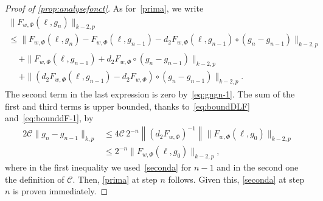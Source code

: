 \documentclass[10pt]{amsart}
\theoremstyle{definition}\newtheorem{defi}[theo]{Definition}\newtheorem{rema}[theo]{Remark}\newtheorem{exam}[theo]{Example}\newtheorem{exem}[theo]{Example}\newtheorem{nota}[theo]{Notation}
\newcommand{\clC}{\mathcal{C}}
\begin{document}
\begin{proof}[Proof of \cref{prop:analysefonct}]
As for~\eqref{prima}, we write
\begin{multline}
\|F_{w,\Phi}(\ell,g_n)\|_{k-2,p}\\
\le \big\|F_{w,\Phi}(\ell,g_n)-F_{w,\Phi}(\ell,g_{n-1})-d_2 F_{w,\Phi}(\ell,g_{n-1})\circ(g_n-g_{n-1})\big\|_{k-2,p}\\
\begin{aligned}
&+ \big\|F_{w,\Phi}(\ell,g_{n-1})+d_2 F_{w,\Phi}\circ(g_n-g_{n-1})\|_{k-2,p}\\
&+\big\|(d_2 F_{w,\Phi}(\ell,g_{n-1})-d_2F_{w,\Phi})\circ(g_n-g_{n-1})\big\|_{k-2,p}.
\end{aligned}
\end{multline}
The second term in the last expression is zero by~\eqref{eq:gngn-1}. The sum of the first and third terms is upper bounded, thanks to~\eqref{eq:boundDLF} and~\eqref{eq:bounddF-1}, by
\begin{align}
2\clC \|g_n-g_{n-1}\|_{k,p}&\le 4 \clC \, 2^{-n}\left\|(d_2 F_{w,\Phi})^{-1}\right\|
\|F_{w,\Phi}(\ell,g_0)\|_{k-2,p}\\
&\le 2^{-n}\|F_{w,\Phi}(\ell,g_0)\|_{k-2,p},
\end{align}
where in the first inequality we used~\eqref{seconda} for $n-1$ and in the second one the definition of $\clC$. Then, \eqref{prima} at step $n$ follows. Given this, \eqref{seconda} at step $n$ is proven immediately.




\end{proof}
\end{document}
